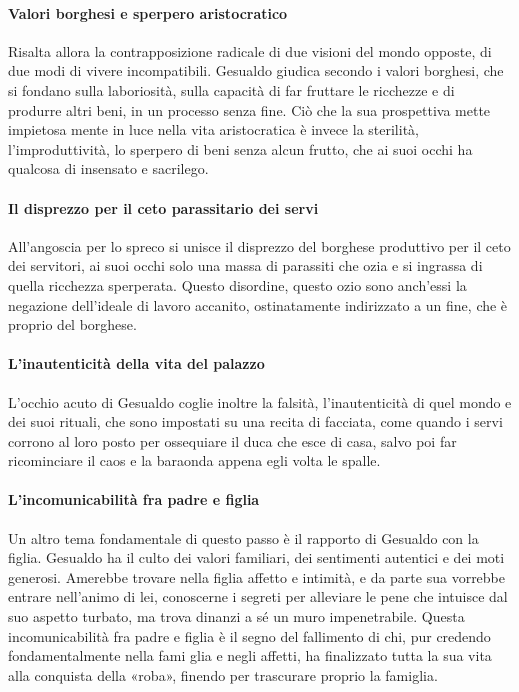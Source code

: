 \documentclass{book}
\begin{document}
\paragraph{Valori borghesi e sperpero aristocratico}

Risalta allora la contrapposizione radicale di due visioni del mondo opposte, di due modi di vivere incompatibili. Gesualdo giudica secondo i valori borghesi, che si fondano sulla laboriosità, sulla capacità di far fruttare le ricchezze e di produrre altri beni, in un processo senza fine. Ciò che la sua prospettiva mette impietosa mente in luce nella vita aristocratica è invece la sterilità, l'improduttività, lo sperpero di beni senza alcun frutto, che ai suoi occhi ha qualcosa di insensato e sacrilego.

\paragraph{Il disprezzo per il ceto parassitario dei servi}

All'angoscia per lo spreco si unisce il disprezzo del borghese produttivo per il ceto dei servitori, ai suoi occhi solo una massa di parassiti che ozia e si ingrassa di quella ricchezza sperperata. Questo disordine, questo ozio sono anch'essi la negazione dell'ideale di lavoro accanito, ostinatamente indirizzato a un fine, che è proprio del borghese.

\paragraph{L'inautenticità della vita del palazzo}

L'occhio acuto di Gesualdo coglie inoltre la falsità, l'inautenticità di quel mondo e dei suoi rituali, che sono impostati su una recita di facciata, come quando i servi corrono al loro posto per ossequiare il duca che esce di casa, salvo poi far ricominciare il caos e la baraonda appena egli volta le spalle.

\paragraph{L'incomunicabilità fra padre e figlia}

Un altro tema fondamentale di questo passo è il rapporto di Gesualdo con la figlia. Gesualdo ha il culto dei valori familiari, dei sentimenti autentici e dei moti generosi. Amerebbe trovare nella figlia affetto e intimità, e da parte sua vorrebbe entrare nell'animo di lei, conoscerne i segreti per alleviare le pene che intuisce dal suo aspetto turbato, ma trova dinanzi a sé un muro impenetrabile. Questa incomunicabilità fra padre e figlia è il segno del fallimento di chi, pur credendo fondamentalmente nella fami glia e negli affetti, ha finalizzato tutta la sua vita alla conquista della «roba», finendo per trascurare proprio la famiglia.
\end{document}
